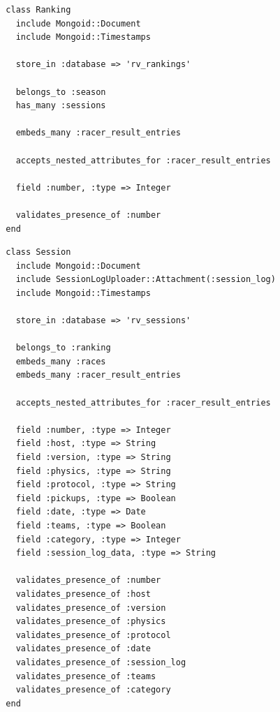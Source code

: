 \begin{listing}
  \begin{verbatim}
  class Ranking
    include Mongoid::Document
    include Mongoid::Timestamps
    
    store_in :database => 'rv_rankings'
    
    belongs_to :season
    has_many :sessions
    
    embeds_many :racer_result_entries
    
    accepts_nested_attributes_for :racer_result_entries
    
    field :number, :type => Integer
    
    validates_presence_of :number
  end
  \end{verbatim}
\end{listing}

\begin{listing}
  \begin{verbatim}
  class Session
    include Mongoid::Document
    include SessionLogUploader::Attachment(:session_log)
    include Mongoid::Timestamps
    
    store_in :database => 'rv_sessions'
    
    belongs_to :ranking
    embeds_many :races
    embeds_many :racer_result_entries
    
    accepts_nested_attributes_for :racer_result_entries
    
    field :number, :type => Integer
    field :host, :type => String
    field :version, :type => String
    field :physics, :type => String
    field :protocol, :type => String
    field :pickups, :type => Boolean
    field :date, :type => Date
    field :teams, :type => Boolean
    field :category, :type => Integer
    field :session_log_data, :type => String
    
    validates_presence_of :number
    validates_presence_of :host
    validates_presence_of :version
    validates_presence_of :physics
    validates_presence_of :protocol
    validates_presence_of :date
    validates_presence_of :session_log
    validates_presence_of :teams
    validates_presence_of :category
  end
  \end{verbatim}
\end{listing}

